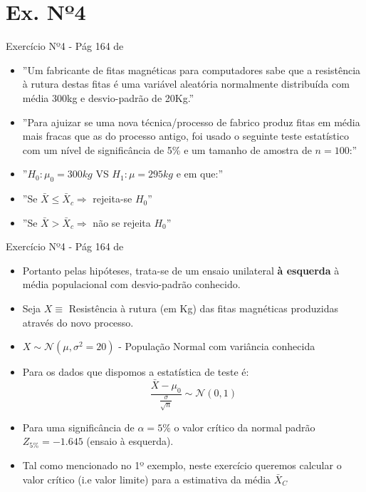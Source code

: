 \documentclass[10,5pt, pdf]{beamer}
\begin{document}
\section{Ex. Nº4}\label{sec:ex4}
\begin{frame}{Exercício Nº4 -  Pág 164 de \cite{reis2021}}
\begin{itemize}
    \item{''Um fabricante de fitas magnéticas para computadores sabe que a resistência à rutura destas fitas é uma variável aleatória normalmente distribuída com média 300kg e desvio-padrão de 20Kg.''}
    \item{''Para ajuizar se uma nova técnica/processo de fabrico produz fitas em média mais fracas que as do processo antigo, foi usado o seguinte teste estatístico com um nível de significância de 5\% e um tamanho de amostra de $n=100$:''}
    \item{''$H_0:\mu_0=300kg$ VS $H_1:\mu=295kg$ e em que:''}
    \item{''Se $\bar{X}\leq \bar{X}_c \Longrightarrow$ rejeita-se $H_0$''}
    \item{''Se $\bar{X}> \bar{X}_c \Longrightarrow$ não se rejeita $H_0$''}
\end{itemize}
\end{frame}

\begin{frame}{Exercício Nº4 -  Pág 164 de \cite{reis2021}}
\begin{itemize}
    \item{Portanto pelas hipóteses, trata-se de um ensaio unilateral \textbf{à esquerda} à média populacional com desvio-padrão conhecido.}
    \pause
    \item{Seja $X\equiv$ Resistência à rutura (em Kg) das fitas magnéticas produzidas através do novo processo.}
    \item{$X\sim \mathcal{N}(\mu, \sigma^2=20)$ - População Normal com variância conhecida}
    \pause
    \item{Para os dados que dispomos a estatística de teste é:}
    \begin{equation}
        \frac{\bar{X} - \mu_0}{\frac{\sigma}{\sqrt{n}}}\sim \mathcal{N}(0,1)
    \end{equation}
    \pause
    \item{Para uma significância de $\alpha=5\%$ o valor crítico da normal padrão $Z_{5\%}=-1.645$ (ensaio à esquerda).}
    \pause
    \item{Tal como mencionado no 1º exemplo, neste exercício queremos calcular o valor crítico (i.e valor limite) para a estimativa da média $\bar{X}_{C}$}
\end{itemize}
\end{frame}
\end{document}
